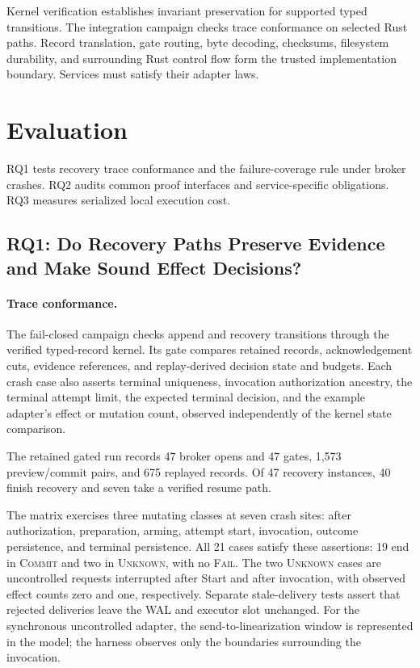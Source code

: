 \documentclass[acmsmall,screen,review,anonymous]{acmart}
\newcommand{\Unknown}{\textsc{Unknown}\xspace}
\newcommand{\Commit}{\textsc{Commit}\xspace}
\newcommand{\Fail}{\textsc{Fail}\xspace}
\begin{document}
Kernel verification establishes invariant preservation for supported typed
transitions. The integration campaign checks trace conformance on selected
Rust paths. Record translation, gate routing, byte decoding, checksums,
filesystem durability, and surrounding Rust control flow form the trusted
implementation boundary. Services must satisfy their adapter laws.

\section{Evaluation}
\label{sec:evaluation}

RQ1 tests recovery trace conformance and the failure-coverage rule under
broker crashes. RQ2 audits common proof interfaces and service-specific
obligations. RQ3 measures serialized local execution cost.

\subsection{RQ1: Do Recovery Paths Preserve Evidence and Make Sound
Effect Decisions?}

\paragraph{Trace conformance.}
The fail-closed campaign checks append and recovery transitions through
the verified typed-record kernel. Its gate compares retained records,
acknowledgement cuts, evidence references, and replay-derived decision
state and budgets. Each crash case also asserts terminal uniqueness,
invocation authorization ancestry, the terminal attempt limit, the
expected terminal decision, and the example adapter's effect or
mutation count, observed independently of the kernel state comparison.

The retained gated run records 47 broker opens and 47 gates, 1,573
preview/commit pairs, and 675 replayed records. Of 47 recovery instances,
40 finish recovery and seven take a verified resume path.

The matrix exercises three mutating classes at seven crash sites:
after authorization, preparation, arming, attempt start, invocation,
outcome persistence, and terminal persistence. All 21 cases satisfy
these assertions: 19 end in \Commit and two in \Unknown, with no \Fail.
The two \Unknown cases are uncontrolled requests interrupted after
Start and after invocation, with observed effect counts zero and one,
respectively. Separate stale-delivery tests assert that rejected deliveries leave the WAL and
executor slot unchanged. For the synchronous uncontrolled adapter,
the send-to-linearization window is represented in the model; the
harness observes only the boundaries surrounding the invocation.
\end{document}

